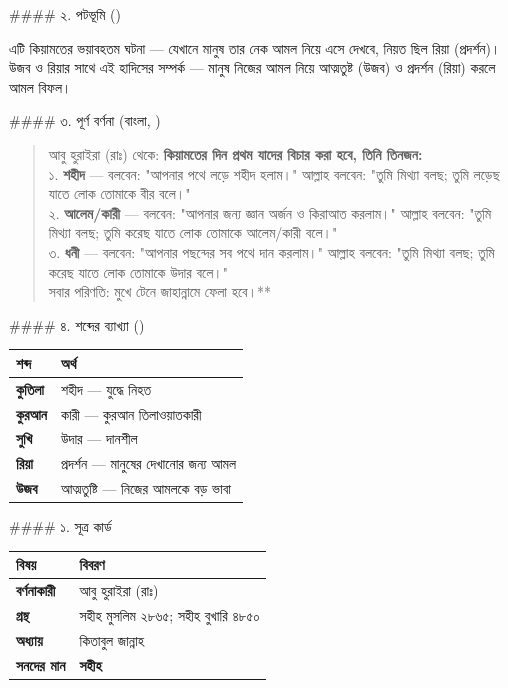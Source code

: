\#\#\#\# ২. পটভূমি ()

এটি কিয়ামতের ভয়াবহতম ঘটনা — যেখানে মানুষ তার নেক আমল নিয়ে এসে দেখবে, নিয়ত ছিল রিয়া (প্রদর্শন)। উজব ও রিয়ার সাথে এই হাদিসের সম্পর্ক — মানুষ নিজের আমল নিয়ে আত্মতুষ্ট (উজব) ও প্রদর্শন (রিয়া) করলে আমল বিফল।

\#\#\#\# ৩. পূর্ণ বর্ণনা (বাংলা, )

\begin{quote}
আবু হুরাইরা (রাঃ) থেকে: \textbf{কিয়ামতের দিন প্রথম যাদের বিচার করা হবে, তিনি তিনজন:} \\
১. \textbf{শহীদ} — বলবেন: "আপনার পথে লড়ে শহীদ হলাম।" আল্লাহ বলবেন: "তুমি মিথ্যা বলছ; তুমি লড়েছ যাতে লোক তোমাকে বীর বলে।" \\
২. \textbf{আলেম/কারী} — বলবেন: "আপনার জন্য জ্ঞান অর্জন ও কিরাআত করলাম।" আল্লাহ বলবেন: "তুমি মিথ্যা বলছ; তুমি করেছ যাতে লোক তোমাকে আলেম/কারী বলে।" \\
৩. \textbf{ধনী} — বলবেন: "আপনার পছন্দের সব পথে দান করলাম।" আল্লাহ বলবেন: "তুমি মিথ্যা বলছ; তুমি করেছ যাতে লোক তোমাকে উদার বলে।" \\
সবার পরিণতি: মুখে টেনে জাহান্নামে ফেলা হবে।**
\end{quote}

\#\#\#\# ৪. শব্দের ব্যাখ্যা ()

\begin{table}[h]\centering\small
\begin{tabular}{ll}
শব্দ & অর্থ \\
\hline
\textbf{কুতিলা} & শহীদ — যুদ্ধে নিহত \\
\textbf{কুরআন} & কারী — কুরআন তিলাওয়াতকারী \\
\textbf{সুখি} & উদার — দানশীল \\
\textbf{রিয়া} & প্রদর্শন — মানুষের দেখানোর জন্য আমল \\
\textbf{উজব} & আত্মতুষ্টি — নিজের আমলকে বড় ভাবা \\
\hline
\end{tabular}
\end{table}

\#\#\#\# ১. সূত্র কার্ড

\begin{table}[h]\centering\small
\begin{tabular}{ll}
বিষয় & বিবরণ \\
\hline
\textbf{বর্ণনাকারী} & আবু হুরাইরা (রাঃ) \\
\textbf{গ্রন্থ} & সহীহ মুসলিম ২৮৬৫; সহীহ বুখারি ৪৮৫০ \\
\textbf{অধ্যায়} & কিতাবুল জান্নাহ \\
\textbf{সনদের মান} & \textbf{সহীহ} \\
\hline
\end{tabular}
\end{table}

